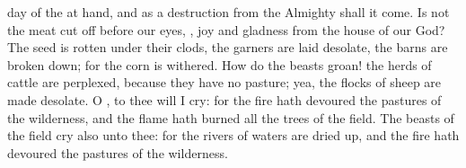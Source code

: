 {day of the
{}
{} at
hand, and as a
destruction from the
Almighty shall it
come.
Is not the
meat cut
off before our
eyes,
{},
joy and
gladness from the
house of our
God?
The
seed is
rotten under their
clods, the
garners are laid
desolate, the
barns are broken
down; for the
corn is
withered.
How do the
beasts
groan! the
herds of
cattle are
perplexed, because they have no
pasture; yea, the
flocks of
sheep are made
desolate.
O
{}, to thee will I
cry: for the
fire hath
devoured the
pastures of the
wilderness, and the
flame hath
burned all the
trees of the
field.
The
beasts of the
field
cry also unto thee: for the
rivers of
waters are dried
up, and the
fire hath
devoured the
pastures of the
wilderness.

}
